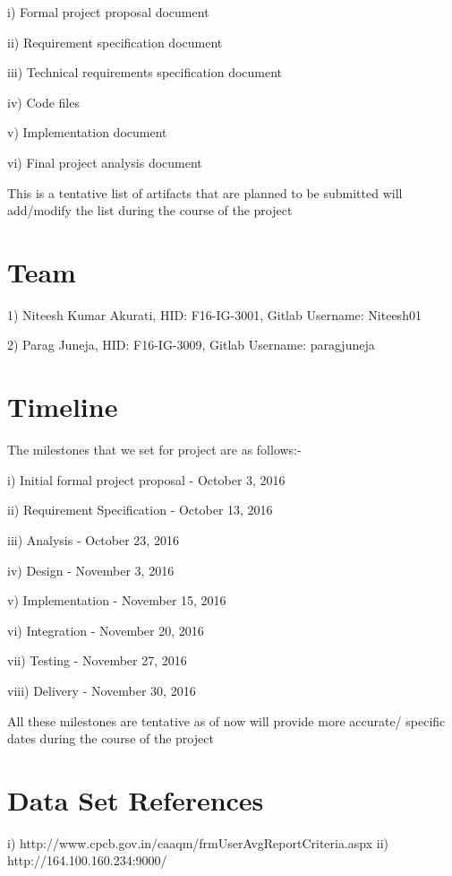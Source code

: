 \documentclass{acm_proc_article-sp}
\begin{document}
i) Formal project proposal document

ii) Requirement specification document

iii) Technical requirements specification document

iv) Code files

v) Implementation document

vi) Final project analysis document

This is a tentative list of artifacts that are planned to be submitted will add/modify the list during the course of the project


\section{Team}

1) Niteesh Kumar Akurati, HID: F16-IG-3001, Gitlab Username: Niteesh01

2) Parag Juneja, HID: F16-IG-3009, Gitlab Username: paragjuneja

\section{Timeline}
The milestones that we set for project are as follows:-

i) Initial formal project proposal - October 3, 2016

ii) Requirement Specification      - October 13, 2016

iii) Analysis                      - October 23, 2016

iv) Design                         - November 3, 2016

v) Implementation                   - November 15, 2016

vi) Integration                     - November 20, 2016

vii) Testing                        - November 27, 2016

viii) Delivery                      - November 30, 2016

All these milestones are tentative as of now will provide more accurate/ specific dates during the course of the project


\section{Data Set References}

i)  http://www.cpcb.gov.in/caaqm/frmUserAvgReportCriteria.aspx
ii) http://164.100.160.234:9000/





\end{document}
